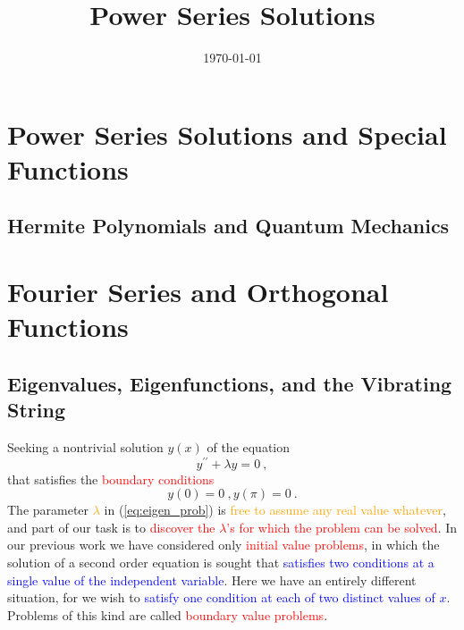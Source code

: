 \documentclass[12pt,a4paper]{article}
\title{Power Series Solutions}
\author{}
\date{\today}
\begin{document}
\maketitle










\section{Power Series Solutions and Special Functions}




\subsection{Hermite Polynomials and Quantum Mechanics}








\section{Fourier Series and Orthogonal Functions}









\subsection{Eigenvalues, Eigenfunctions, and the Vibrating String}
Seeking a nontrivial solution $y(x)$ of the equation
\begin{equation}
y^{\prime\prime} +\lambda y = 0 ~,
\label{eq:eigen_prob}
\end{equation}
that satisfies the \textcolor{red}{boundary conditions}
\begin{equation}
y(0) = 0 ~, y(\pi) = 0 ~.
\label{eq:eigen_bound}
\end{equation}
The parameter \textcolor{orange}{$\lambda$} in (\ref{eq:eigen_prob}) is \textcolor{orange}{free to assume any real value whatever}, and part of our task is to \textcolor{red}{discover the $\lambda$'s for which the problem can be solved}. In our previous work we have considered only \textcolor{red}{initial value problems}, in which the solution of a second order equation is sought that \textcolor{blue}{satisfies two conditions at a single value of the independent variable}. Here we have an entirely different situation, for we wish to \textcolor{blue}{satisfy one condition at each of two distinct values of $x$}. Problems of this kind are called \textcolor{red}{boundary value problems}. 
\end{document}
